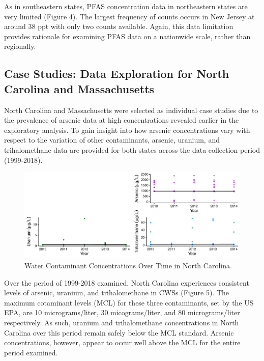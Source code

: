 \documentclass[12pt,]{article}
\begin{document}
As in southeastern states, PFAS concentration data in northeastern
states are very limited (Figure 4). The largest frequency of counts
occurs in New Jersey at around 38 ppt with only two counts available.
Again, this data limitation provides rationale for examining PFAS data
on a nationwide scale, rather than regionally.

\newpage

\hypertarget{case-studies-data-exploration-for-north-carolina-and-massachusetts}{%
\subsection{Case Studies: Data Exploration for North Carolina and
Massachusetts}\label{case-studies-data-exploration-for-north-carolina-and-massachusetts}}

North Carolina and Massachusetts were selected as individual case
studies due to the prevalence of arsenic data at high concentrations
revealed earlier in the exploratory analysis. To gain insight into how
arsenic concentrations vary with respect to the variation of other
contaminants, arsenic, uranium, and trihalomethane data are provided for
both states across the data collection period (1999-2018).

\begin{figure}
\centering
\includegraphics{Project_Template_files/figure-latex/figs5-1.pdf}
\caption{Water Contaminant Concentrations Over Time in North Carolina.}
\end{figure}

Over the period of 1999-2018 examined, North Carolina experiences
consistent levels of arsenic, uranium, and trihalomethane in CWSs
(Figure 5). The maximum cotaminant levels (MCL) for these three
contaminants, set by the US EPA, are 10 micrograms/liter, 30
micograms/liter, and 80 micrograms/liter respectively. As such, uranium
and trihalomethane concentrations in North Carolina over this period
remain safely below the MCL standard. Arsenic concentrations, however,
appear to occur well above the MCL for the entire period examined.
\end{document}
